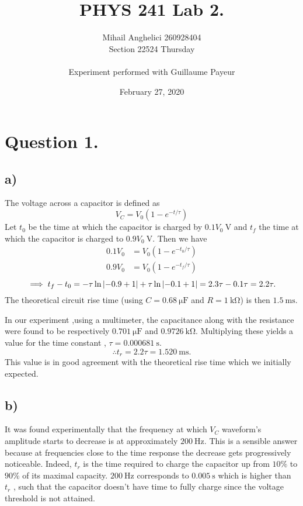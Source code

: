 \documentclass[
	12pt,
	]{article}
\title{PHYS 241 Lab 2.}
\author{Mihail Anghelici 260928404 \\ Section  22524 Thursday\\ \\ Experiment performed with Guillaume Payeur}
\date{February 27, 2020}
\theoremstyle{definition}
\theoremstyle{definition}
\theoremstyle{definition}
\theoremstyle{definition}
\theoremstyle{definition}
\theoremstyle{example}
\theoremstyle{note}
\theoremstyle{remark}
\theoremstyle{example}
\begin{document}
	\maketitle
		\section*{Question 1.}
			\subsection*{a) }
				The voltage across a capacitor is defined as 
				$$ V_{C} = V_0 \left(1-e^{-t/\tau}\right)$$
				Let $t_{0}$ be the time at which the capacitor is charged by $0.1V_{0} \ \si{\volt}$ and $t_{f}$ the time at which the capacitor is charged to $0.9V_{0} \ \si{\volt}$. Then we have 
				\begin{align*}
					0.1 V_{0} &= V_{0} \left(1-e^{-t_{0}/ \tau}\right) \\
					0.9 V_{0} &= V_{0} \left(1- e^{-t_{f}/ \tau}\right)
				\end{align*}
				$$ \implies t_{f} - t_{0} = -\tau \ln \abs{-0.9 +1 } + \tau \ln \abs{-0.1 + 1} = 2.3\tau - 0.1 \tau = 2.2\tau.$$ 
				The theoretical circuit rise time (using $C = 0.68 \ \si{\micro\farad}$ and $R = 1 \ \si{\kilo\ohm}$) is then $1.5 \ \si{\milli\second}$.
				
				In our experiment ,using a multimeter, the capacitance along with the resistance were found to be respectively $0.701 \ \si{\micro\farad}$ and $0.9726 \ \si{\kilo\ohm}$. Multiplying these yields a value for the time constant , $\tau = 0.000681 \ \si{\second}$. 
				$$ \therefore t_{r} = 2.2\tau = 1.520 \ \si{\milli\second}.$$
				This value is in good agreement with the theoretical rise time which we initially expected.
			
			\subsection*{b) }
				It was found experimentally that the frequency at which $V_C$ waveform's amplitude starts to decrease is at approximately $200 \ \si{\hertz}$. This is a sensible answer because at frequencies close to the time response the decrease gets progressively noticeable. Indeed, $t_r$ is the time required to charge the capacitor up from $10 \%$ to $90 \%$ of its maximal capacity. $200 \ \si{\hertz}$ corresponds to $0.005  \ \si{\second}$ which is higher than $t_r$ , such that the capacitor doesn't have time to fully charge since the voltage threshold is not attained. 
\end{document}
